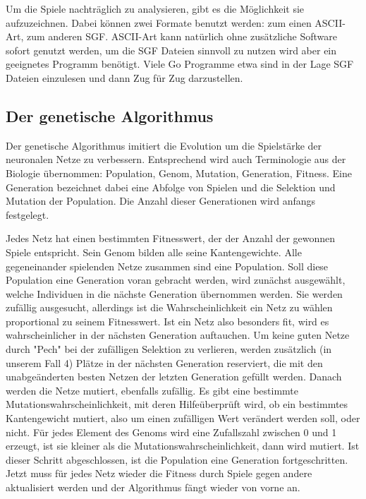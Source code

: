 Um die Spiele nachträglich zu analysieren, gibt es die Möglichkeit sie
aufzuzeichnen. Dabei können zwei Formate benutzt werden: zum einen ASCII-Art,
zum anderen SGF. ASCII-Art kann natürlich ohne zusätzliche Software sofort
genutzt werden, um die SGF Dateien sinnvoll zu nutzen wird aber ein geeignetes
Programm benötigt. Viele Go Programme etwa sind in der Lage SGF Dateien
einzulesen und dann Zug für Zug darzustellen. 

\subsection{Der genetische Algorithmus}

Der genetische Algorithmus imitiert die Evolution um die Spielstärke der
neuronalen Netze zu verbessern. Entsprechend wird auch Terminologie aus der
Biologie übernommen: Population, Genom, Mutation, Generation, Fitness. Eine
Generation bezeichnet dabei eine Abfolge von Spielen und die Selektion und
Mutation der Population. Die Anzahl dieser Generationen wird anfangs festgelegt.

Jedes Netz hat einen bestimmten Fitnesswert, der der Anzahl der gewonnen Spiele
entspricht. Sein Genom bilden alle seine Kantengewichte. Alle gegeneinander
spielenden Netze zusammen sind eine Population. Soll diese Population eine
Generation voran gebracht werden, wird zunächst ausgewählt, welche Individuen in
die nächste Generation übernommen werden. Sie werden zufällig ausgesucht,
allerdings ist die Wahrscheinlichkeit ein Netz zu wählen proportional zu seinem
Fitnesswert. Ist ein Netz also besonders fit, wird es wahrscheinlicher in der
nächsten Generation auftauchen. Um keine guten Netze durch "Pech" bei der 
zufälligen Selektion zu verlieren, werden zusätzlich (in unserem Fall 4) Plätze 
in der nächsten Generation reserviert, die mit den unabgeänderten besten Netzen 
der letzten Generation gefüllt werden. Danach werden die Netze mutiert, 
ebenfalls zufällig. Es gibt eine bestimmte Mutationswahrscheinlichkeit, mit 
deren Hilfeüberprüft wird, ob ein bestimmtes Kantengewicht mutiert, also um einen
zufälligen Wert verändert werden soll, oder nicht. Für jedes Element des Genoms
wird eine Zufallszahl zwischen 0 und 1 erzeugt, ist sie kleiner als die
Mutationswahrscheinlichkeit, dann wird mutiert. Ist dieser Schritt abgeschlossen, 
ist die Population eine Generation fortgeschritten. Jetzt muss für jedes Netz 
wieder die Fitness durch Spiele gegen andere aktualisiert werden und der 
Algorithmus fängt wieder von vorne an.

